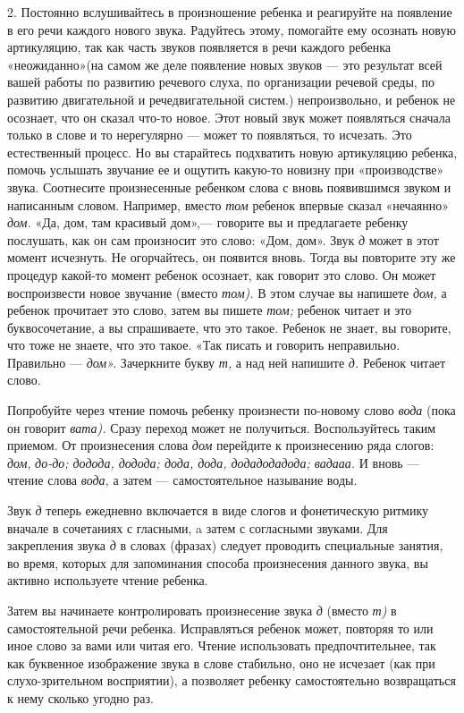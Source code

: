 \documentclass[a5paper]{book}
\renewcommand{\emph}[1]{\textit{#1}}
\begin{document}
2. Постоянно вслушивайтесь в произношение ребенка и реагируйте на
появление в его речи каждого нового звука. Радуйтесь этому, помогайте
ему осознать новую артикуляцию, так как часть звуков появляется в речи
каждого ребенка «неожиданно»(на самом же деле появление новых звуков ---
это результат всей вашей работы по развитию речевого слуха, по
организации речевой среды, по развитию двигательной и речедвигательной
систем.) непроизвольно, и ребенок не осознает, что он сказал что-то
новое. Этот новый звук может появляться сначала только в слове и то
нерегулярно --- может то появляться, то исчезать. Это естественный
процесс. Но вы старайтесь подхватить новую артикуляцию ребенка, помочь
услышать звучание ее и ощутить какую-то новизну при «производстве»
звука. Соотнесите произнесенные ребенком слова с вновь появившимся
звуком и написанным словом. Например, вместо \emph{том} ребенок впервые
сказал «нечаянно» \emph{дом.} «Да, дом, там красивый дом»,--- говорите
вы и предлагаете ребенку послушать, как он сам произносит это слово:
«Дом, дом». Звук \emph{д} может в этот момент исчезнуть. Не огорчайтесь,
он появится вновь. Тогда вы повторите эту же процедур какой-то момент
ребенок осознает, как говорит это слово. Он может воспроизвести новое
звучание (вместо \emph{том).} В этом случае вы напишете \emph{дом,} а
ребенок прочитает это слово, затем вы пишете \emph{том;} ребенок читает
и это буквосочетание, а вы спрашиваете, что это такое. Ребенок не знает,
вы говорите, что тоже не знаете, что это такое. «Так писать и говорить
неправильно. Правильно --- \emph{дом».} Зачеркните букву \emph{т,} а над
ней напишите \emph{д.} Ребенок читает слово.

Попробуйте через чтение помочь ребенку произнести по-новому слово
\emph{вода} (пока он говорит \emph{вата).} Сразу переход может не
получиться. Воспользуйтесь таким приемом. От произнесения слова
\emph{дом} перейдите к произнесению ряда слогов: \emph{дом},
\emph{до-до; додода, додода; дода, дода, додадодадода; вадааа.} И вновь
--- чтение слова \emph{вода,} а затем --- самостоятельное называние
воды.

Звук \emph{д} теперь ежедневно включается в виде слогов и фонетическую
ритмику вначале в сочетаниях с гласными, a затем с согласными звуками.
Для закрепления звука \emph{д} в словах (фразах) следует проводить
специальные занятия, во время, которых для запоминания способа
произнесения данного звука, вы активно используете чтение ребенка.

Затем вы начинаете контролировать произнесение звука \emph{д} (вместо
\emph{т)} в самостоятельной речи ребенка. Исправляться ребенок может,
повторяя то или иное слово за вами или читая его. Чтение использовать
предпочтительнее, так как буквенное изображение звука в слове стабильно,
оно не исчезает (как при слухо-зрительном восприятии), а позволяет
ребенку самостоятельно возвращаться к нему сколько угодно раз.
\end{document}
